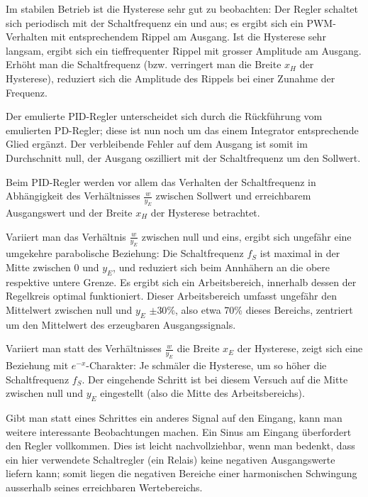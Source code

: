 \documentclass[a4paper,10pt]{article}
\begin{document}
Im  stabilen Betrieb  ist die  Hysterese  sehr gut  zu beobachten: Der  Regler
schaltet sich  periodisch mit der Schaltfrequenz  ein und aus; es  ergibt sich
ein PWM-Verhalten  mit entsprechendem  Rippel am  Ausgang.  Ist  die Hysterese
sehr langsam, ergibt  sich ein tieffrequenter Rippel mit  grosser Amplitude am
Ausgang. Erh\"oht man die Schaltfrequenz (bzw. verringert man die Breite $x_H$
der Hysterese), reduziert sich die Amplitude des Rippels bei einer Zunahme der
Frequenz.

\vspace{1em}

Der  emulierte PID-Regler  unterscheidet  sich durch  die R\"uckf\"uhrung  vom
emulierten PD-Regler; diese ist nun noch um das einem Integrator entsprechende
Glied  erg\"anzt. Der  verbleibende  Fehler  auf  dem  Ausgang  ist  somit  im
Durchschnitt  null,  der Ausgang  oszilliert  mit  der Schaltfrequenz  um  den
Sollwert.

Beim  PID-Regler  werden  vor  allem   das  Verhalten  der  Schaltfrequenz  in
Abh\"angigkeit  des Verh\"altnisses  $\frac{w}{y_{E}}$ zwischen  Sollwert und
erreichbarem Ausgangswert und der Breite $x_{H}$ der Hysterese betrachtet.

Variiert man das Verh\"altnis $\frac{w}{y_{E}}$ zwischen null und eins, ergibt
sich  ungef\"ahr  eine  umgekehre parabolische  Beziehung: Die  Schaltfrequenz
$f_{S}$ ist  maximal in der Mitte  zwischen 0 und $y_{E}$,  und reduziert sich
beim Annh\"ahern  an die  obere respektive untere  Grenze. Es ergibt  sich ein
Arbeitsbereich, innerhalb  dessen der Regelkreis  optimal funktioniert. Dieser
Arbeitsbereich umfasst ungef\"ahr den Mittelwert  zwischen null und $y_E$ $\pm
30\%$,  also  etwa 70\%  dieses  Bereichs,  zentriert  um den  Mittelwert  des
erzeugbaren Ausgangssignals.

Variiert man  statt des  Verh\"altnisses $\frac{w}{y_{E}}$ die  Breite $x_{E}$
der Hysterese, zeigt sich eine Beziehung mit $e^{-x}$-Charakter: Je schm\"aler
die  Hysterese,  um  so  h\"oher die  Schaltfrequenz  $f_{S}$. Der  eingehende
Schritt  ist  bei  diesem  Versuch  auf die  Mitte  zwischen  null  und  $y_E$
eingestellt (also die Mitte des Arbeitsbereichs).

Gibt man  statt eines Schrittes ein  anderes Signal auf den  Eingang, kann man
weitere interessante Beobachtungen machen. Ein  Sinus am Eingang \"uberfordert
den Regler vollkommen. Dies ist leicht nachvollziehbar, wenn man bedenkt, dass
ein hier  verwendete Schaltregler  (ein Relais) keine  negativen Ausgangswerte
liefern  kann;   somit  liegen  die  negativen   Bereiche  einer  harmonischen
Schwingung ausserhalb seines erreichbaren Wertebereichs.
\end{document}
